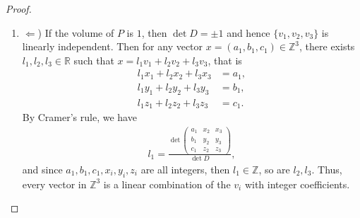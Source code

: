 \documentclass[11pt]{article}
\theoremstyle{definition}
\numberwithin{equation}{subsection}
\begin{document}
\begin{proof}
\begin{enumerate}[label=(\alph*)]
    \item $\Leftarrow$) If the volume of $P$ is $1$, then $\det D = \pm 1$ and hence $\{v_1, v_2, v_3\}$ is linearly independent. Then for any vector $x = (a_1, b_1, c_1) \in \mathbb{Z}^3$, there exists $l_1, l_2, l_3 \in \mathbb{R}$ such that $x = l_1 v_1 + l_2 v_2 + l_3 v_3$, that is 
    \begin{align*}
        l_1 x_1 + l_2 x_2 + l_3 x_3 & = a_1, \\
        l_1 y_1 + l_2 y_2 + l_3 y_3 & = b_1, \\
        l_1 z_1 + l_2 z_2 + l_3 z_3 & = c_1.
    \end{align*}
    By Cramer's rule, we have
    \begin{align*}
        l_1 = \frac{\det \begin{pmatrix} 
        a_1 & x_2 & x_3 \\
        b_1 & y_2 & y_3 \\
        c_1 & z_2 & z_3
        \end{pmatrix}}{\det D},
    \end{align*}
    and since $a_1, b_1, c_1, x_i, y_i, z_i$ are all integers, then $l_1 \in \mathbb{Z}$, so are $l_2, l_3$. Thus, every vector in $\mathbb{Z}^3$ is a linear combination of the $v_i$ with integer coefficients.
    \end{enumerate}
\end{proof}

\medskip
\end{document}
